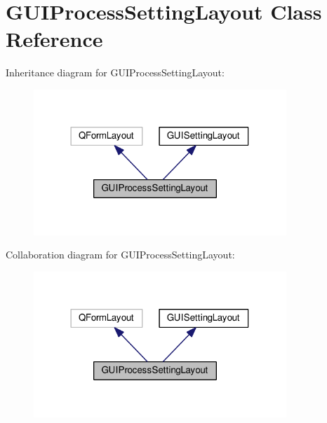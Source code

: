 \hypertarget{class_g_u_i_process_setting_layout}{}\section{G\+U\+I\+Process\+Setting\+Layout Class Reference}
\label{class_g_u_i_process_setting_layout}


Inheritance diagram for G\+U\+I\+Process\+Setting\+Layout\+:
\nopagebreak
\begin{figure}[H]
\begin{center}
\leavevmode
\includegraphics[width=270pt]{class_g_u_i_process_setting_layout__inherit__graph}
\end{center}
\end{figure}


Collaboration diagram for G\+U\+I\+Process\+Setting\+Layout\+:
\nopagebreak
\begin{figure}[H]
\begin{center}
\leavevmode
\includegraphics[width=270pt]{class_g_u_i_process_setting_layout__coll__graph}
\end{center}
\end{figure}
